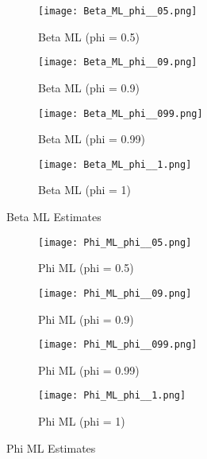 \documentclass[12pt]{article}
\begin{document}
\begin{figure}[H]
    \centering
    \begin{subfigure}[b]{0.45\textwidth}
        \texttt{[image: Beta\_ML\_phi\_\_05.png]}
        \caption{Beta ML (phi = 0.5)}
        \label{fig:beta_ml_0_5}
    \end{subfigure}
    \hfill
    \begin{subfigure}[b]{0.45\textwidth}
        \texttt{[image: Beta\_ML\_phi\_\_09.png]}
        \caption{Beta ML (phi = 0.9)}
        \label{fig:beta_ml_0_9}
    \end{subfigure}
    \vfill
    \begin{subfigure}[b]{0.45\textwidth}
        \texttt{[image: Beta\_ML\_phi\_\_099.png]}
        \caption{Beta ML (phi = 0.99)}
        \label{fig:beta_ml_0_99}
    \end{subfigure}
    \hfill
    \begin{subfigure}[b]{0.45\textwidth}
        \texttt{[image: Beta\_ML\_phi\_\_1.png]}
        \caption{Beta ML (phi = 1)}
        \label{fig:beta_ml_1}
    \end{subfigure}
    \caption{Beta ML Estimates}
    \label{fig:beta_ml}
\end{figure}

\begin{figure}[H]
    \centering
    \begin{subfigure}[b]{0.45\textwidth}
        \texttt{[image: Phi\_ML\_phi\_\_05.png]}
        \caption{Phi ML (phi = 0.5)}
        \label{fig:phi_ml_0_5}
    \end{subfigure}
    \hfill
    \begin{subfigure}[b]{0.45\textwidth}
        \texttt{[image: Phi\_ML\_phi\_\_09.png]}
        \caption{Phi ML (phi = 0.9)}
        \label{fig:phi_ml_0_9}
    \end{subfigure}
    \vfill
    \begin{subfigure}[b]{0.45\textwidth}
        \texttt{[image: Phi\_ML\_phi\_\_099.png]}
        \caption{Phi ML (phi = 0.99)}
        \label{fig:phi_ml_0_99}
    \end{subfigure}
    \hfill
    \begin{subfigure}[b]{0.45\textwidth}
        \texttt{[image: Phi\_ML\_phi\_\_1.png]}
        \caption{Phi ML (phi = 1)}
        \label{fig:phi_ml_1}
    \end{subfigure}
    \caption{Phi ML Estimates}
    \label{fig:phi_ml}
\end{figure}
\end{document}
